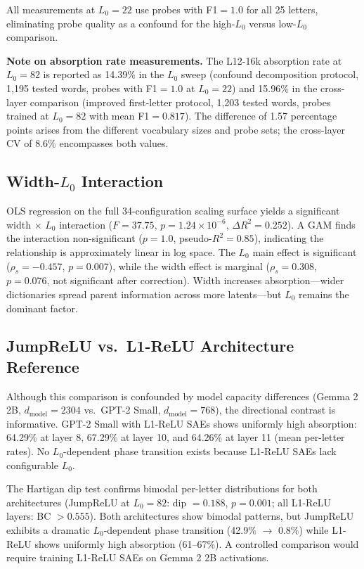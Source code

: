 \documentclass{article}
\begin{document}
All measurements at $L_0{=}22$ use probes with F1${=}1.0$ for all 25 letters, eliminating probe quality as a confound for the high-$L_0$ versus low-$L_0$ comparison.

\textbf{Note on absorption rate measurements.} The L12-16k absorption rate at $L_0{=}82$ is reported as 14.39\% in the $L_0$ sweep (confound decomposition protocol, 1,195 tested words, probes with F1${=}1.0$ at $L_0{=}22$) and 15.96\% in the cross-layer comparison (improved first-letter protocol, 1,203 tested words, probes trained at $L_0{=}82$ with mean F1${}=0.817$). The difference of 1.57 percentage points arises from the different vocabulary sizes and probe sets; the cross-layer CV of 8.6\% encompasses both values.

\subsection{Width-$L_0$ Interaction}

OLS regression on the full 34-configuration scaling surface yields a significant width $\times$ $L_0$ interaction ($F = 37.75$, $p = 1.24 \times 10^{-6}$, $\Delta R^2 = 0.252$). A GAM finds the interaction non-significant ($p = 1.0$, pseudo-$R^2 = 0.85$), indicating the relationship is approximately linear in log space. The $L_0$ main effect is significant ($\rho_s = -0.457$, $p = 0.007$), while the width effect is marginal ($\rho_s = 0.308$, $p = 0.076$, not significant after correction). Width increases absorption---wider dictionaries spread parent information across more latents---but $L_0$ remains the dominant factor.

\subsection{JumpReLU vs.\ L1-ReLU Architecture Reference}

Although this comparison is confounded by model capacity differences (Gemma 2 2B, $d_{\text{model}} = 2304$ vs.\ GPT-2 Small, $d_{\text{model}} = 768$), the directional contrast is informative. GPT-2 Small with L1-ReLU SAEs shows uniformly high absorption: 64.29\% at layer 8, 67.29\% at layer 10, and 64.26\% at layer 11 (mean per-letter rates). No $L_0$-dependent phase transition exists because L1-ReLU SAEs lack configurable $L_0$.

The Hartigan dip test confirms bimodal per-letter distributions for both architectures (JumpReLU at $L_0{=}82$: dip $= 0.188$, $p = 0.001$; all L1-ReLU layers: BC $> 0.555$). Both architectures show bimodal patterns, but JumpReLU exhibits a dramatic $L_0$-dependent phase transition (42.9\% $\to$ 0.8\%) while L1-ReLU shows uniformly high absorption (61--67\%). A controlled comparison would require training L1-ReLU SAEs on Gemma 2 2B activations.
\end{document}
